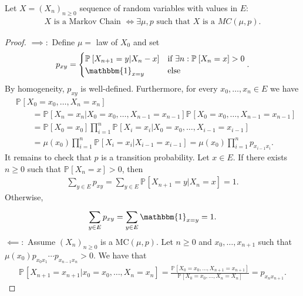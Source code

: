 \begin{prop}
	Let $X=(X_n)_{n \geq 0}$ sequence of random variables with values in $E$:
	\begin{align}
	X\textrm{ is a Markov Chain }\iff \exists \mu, p\textrm{ such that }X\textrm{ is a }MC(\mu, p)
	.\end{align}
	
\end{prop}
\begin{proof}
	$\implies:$ Define $\mu =$ law of $X_0$ and set 
	\begin{align}
		p_{xy} = 
	\begin{cases}
		\mathbb{P}_{} \left[ X_{n+1}=y | X_n -x \right] & \textrm{if } \exists n: \mathbb{P}_{} \left[ X_n = x \right] >0 \\
		\mathbbm{1}_{x=y} & \textrm{else}
	\end{cases}.
	\end{align}
	By homogeneity, $p_{xy}$ is well-defined. Furthermore, for every $x_0,\ldots,x_n \in E$ we have
\begin{align}
& \mathbb{P}_{} \left[ X_0=x_0, \ldots ,X_n=x_n \right] \\ 
	& \qquad = \mathbb{P}_{} \left[ X_n = x_n | X_0=x_0 , \ldots , X_{n-1}=x_{n-1} \right] \mathbb{P}_{} \left[ X_0=x_0 , \ldots , X_{n-1}=x_{n-1} \right] \\
	& \qquad = \mathbb{P}_{} \left[ X_0 = x_0 \right] \prod_{i=1}^{n} \mathbb{P}_{} \left[ X_i = x_i | X_0=x_0, \ldots , X_{i-1}=x_{i-1} \right] \\
	& \qquad = \mu(x_0) \prod_{i=1}^n \mathbb{P}_{} \left[ X_i = x_i | X_{i-1} = x_{i-1}  \right] = \mu(x_0) \prod_{i=1}^n p_{x_{i-1}x_{i}} 
.\end{align}
It remains to check that $p$ is a transition probability. Let $x \in E$. If there exists $n\geq 0$ such that $\mathbb{P}_{} \left[ X_n=x \right] >0$, then 
\begin{align}
	\sum_{y \in E}^{} p_{xy} = \sum_{y \in E}^{} \mathbb{P}_{} \left[ X_{n+1}=y | X_n =x \right] =1.
\end{align}
Otherwise,
\begin{align}
	\sum_{y \in E}^{} p_{xy} = \sum_{y \in E}^{} \mathbbm{1}_{x=y} =1
.\end{align}
$\impliedby:$ Assume  $(X_n)_{n\geq 0}$ is a MC$(\mu ,p)$. Let $n\geq 0$ and $x_0,\ldots,x_{n+1}$ such that $\mu (x_0) p_{x_0 x_1}\cdots p_{x_{n-1}x_n}>0$. We have that
\begin{align}
	\mathbb{P}_{} \left[ X_{n+1} = x_{n+1} | x_0 = x_0, \ldots, X_n = x_n \right] = \frac{\mathbb{P}_{} \left[ X_0 = x_0, \ldots, X_{n+1}= x_{n+1} \right] }{\mathbb{P}_{} \left[ X_0=x_0, \ldots, X_n = X_n \right] } = p_{x_nx_{n+1}}.

\end{align}
\end{proof}
